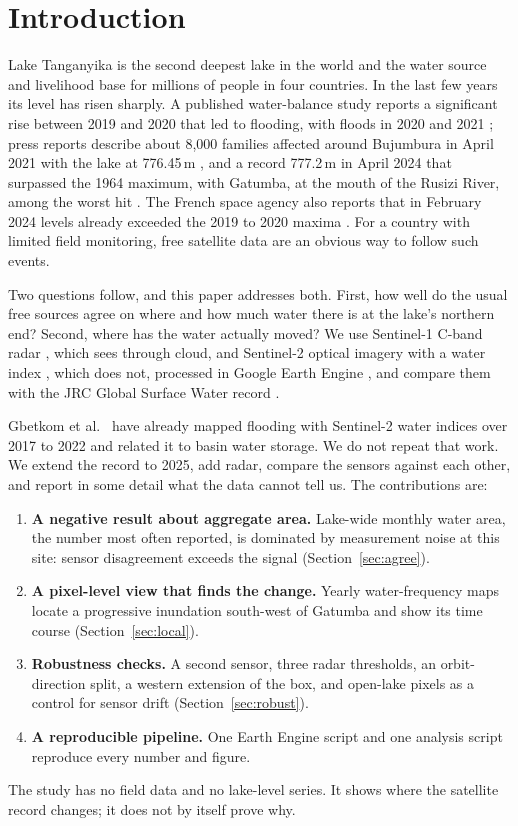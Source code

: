 \documentclass[conference]{IEEEtran}
\begin{document}
\section{Introduction}

Lake Tanganyika is the second deepest lake in the world and the water source and livelihood base for millions of people in four countries. In the last few years its level has risen sharply. A published water-balance study reports a significant rise between 2019 and 2020 that led to flooding, with floods in 2020 and 2021 \cite{gbetkom2024tanganyika}; press reports describe about 8{,}000 families affected around Bujumbura in April 2021 with the lake at 776.45\,m \cite{africanews2021floods}, and a record 777.2\,m in April 2024 that surpassed the 1964 maximum, with Gatumba, at the mouth of the Rusizi River, among the worst hit \cite{manishatse2024record}. The French space agency also reports that in February 2024 levels already exceeded the 2019 to 2020 maxima \cite{cnes2024lakes}. For a country with limited field monitoring, free satellite data are an obvious way to follow such events.

Two questions follow, and this paper addresses both. First, how well do the usual free sources agree on where and how much water there is at the lake's northern end? Second, where has the water actually moved? We use Sentinel-1 C-band radar \cite{torres2012s1}, which sees through cloud, and Sentinel-2 optical imagery with a water index \cite{xu2006mndwi}, which does not, processed in Google Earth Engine \cite{gorelick2017gee}, and compare them with the JRC Global Surface Water record \cite{pekel2016gsw}.

Gbetkom et al.\ \cite{gbetkom2024tanganyika} have already mapped flooding with Sentinel-2 water indices over 2017 to 2022 and related it to basin water storage. We do not repeat that work. We extend the record to 2025, add radar, compare the sensors against each other, and report in some detail what the data cannot tell us. The contributions are:
\begin{enumerate}
\item \textbf{A negative result about aggregate area.} Lake-wide monthly water area, the number most often reported, is dominated by measurement noise at this site: sensor disagreement exceeds the signal (Section~\ref{sec:agree}).
\item \textbf{A pixel-level view that finds the change.} Yearly water-frequency maps locate a progressive inundation south-west of Gatumba and show its time course (Section~\ref{sec:local}).
\item \textbf{Robustness checks.} A second sensor, three radar thresholds, an orbit-direction split, a western extension of the box, and open-lake pixels as a control for sensor drift (Section~\ref{sec:robust}).
\item \textbf{A reproducible pipeline.} One Earth Engine script and one analysis script reproduce every number and figure.
\end{enumerate}
The study has no field data and no lake-level series. It shows where the satellite record changes; it does not by itself prove why.
\end{document}

